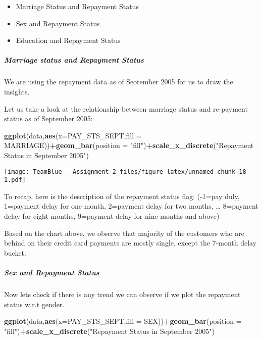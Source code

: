 \documentclass[]{article}
\newenvironment{Shaded}{\begin{snugshade}}{\end{snugshade}}
\newcommand{\KeywordTok}[1]{\textcolor[rgb]{0.13,0.29,0.53}{\textbf{#1}}}
\newcommand{\DataTypeTok}[1]{\textcolor[rgb]{0.13,0.29,0.53}{#1}}
\newcommand{\StringTok}[1]{\textcolor[rgb]{0.31,0.60,0.02}{#1}}
\newcommand{\OperatorTok}[1]{\textcolor[rgb]{0.81,0.36,0.00}{\textbf{#1}}}
\newcommand{\NormalTok}[1]{#1}
\providecommand{\tightlist}{%
  \setlength{\itemsep}{0pt}\setlength{\parskip}{0pt}}
\let\oldsubparagraph\subparagraph
\renewcommand{\subparagraph}[1]{\oldsubparagraph{#1}\mbox{}}
\begin{document}
\begin{itemize}
\tightlist
\item
  Marriage Status and Repayment Status
\item
  Sex and Repayment Status
\item
  Education and Repayment Status
\end{itemize}

\subparagraph{Marriage status and Repayment
Status}\label{marriage-status-and-repayment-status}

We are using the repayment data as of Seotember 2005 for us to draw the
insights.

Let us take a look at the relationship between marriage status and
re-payment status as of September 2005:

\begin{Shaded}
\begin{Highlighting}[]
\KeywordTok{ggplot}\NormalTok{(data,}\KeywordTok{aes}\NormalTok{(}\DataTypeTok{x=}\NormalTok{PAY_STS_SEPT,}\DataTypeTok{fill =}\NormalTok{ MARRIAGE))}\OperatorTok{+}\KeywordTok{geom_bar}\NormalTok{(}\DataTypeTok{position =} \StringTok{"fill"}\NormalTok{)}\OperatorTok{+}\KeywordTok{scale_x_discrete}\NormalTok{(}\StringTok{"Repayment Status in September 2005"}\NormalTok{)}
\end{Highlighting}
\end{Shaded}

\texttt{[image: TeamBlue\_-\_Assignment\_2\_files/figure-latex/unnamed-chunk-18-1.pdf]}

To recap, here is the description of the repayment status flag: (-1=pay
duly, 1=payment delay for one month, 2=payment delay for two months,
\ldots{} 8=payment delay for eight months, 9=payment delay for nine
months and above)

Based on the chart above, we observe that majority of the customers who
are behind on their credit card payments are mostly single, except the
7-month delay bucket.

\subparagraph{Sex and Repayment Status}\label{sex-and-repayment-status}

Now lets check if there is any trend we can observe if we plot the
repayment status w.r.t gender.

\begin{Shaded}
\begin{Highlighting}[]
\KeywordTok{ggplot}\NormalTok{(data,}\KeywordTok{aes}\NormalTok{(}\DataTypeTok{x=}\NormalTok{PAY_STS_SEPT,}\DataTypeTok{fill =}\NormalTok{ SEX))}\OperatorTok{+}\KeywordTok{geom_bar}\NormalTok{(}\DataTypeTok{position =} \StringTok{"fill"}\NormalTok{)}\OperatorTok{+}\KeywordTok{scale_x_discrete}\NormalTok{(}\StringTok{"Repayment Status in September 2005"}\NormalTok{)}
\end{Highlighting}
\end{Shaded}
\end{document}
